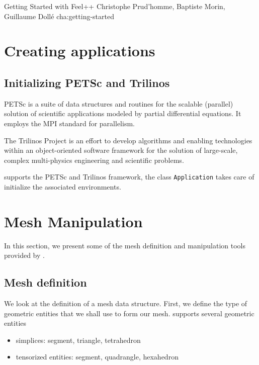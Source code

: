            {Getting Started with Feel++}
            {Christophe Prud'homme, Baptiste Morin, Guillaume Dollé}
            {cha:getting-started}


\section{Creating applications}
\label{sec:creat-appl}




\subsection{Initializing PETSc and Trilinos}


PETSc is a suite of data structures and routines for the scalable (parallel)
solution of scientific applications modeled by partial differential
equations. It employs the MPI standard for parallelism.

The Trilinos Project is an effort to develop algorithms and enabling
technologies within an object-oriented software framework for the solution of
large-scale, complex multi-physics engineering and scientific problems.

\feel supports the PETSc and Trilinos framework, the class
\lstinline!Application! takes care of initialize the
associated environments.


\section{Mesh Manipulation}
\label{sec:mesh-manipulation}


In this section, we present some of the mesh definition and
manipulation tools provided by \feel.

\subsection{Mesh definition}

We look at the definition of a mesh data structure. First, we define
the type of geometric entities that we shall use to form our mesh. \feel supports several geometric entities
\begin{itemize}
\item simplices: segment, triangle, tetrahedron
\item tensorized entities: segment, quadrangle, hexahedron
\end{itemize}

